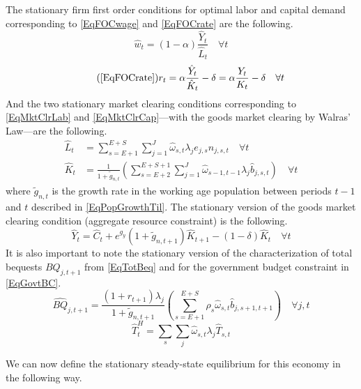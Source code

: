 \documentclass[letterpaper,12pt]{article}
\theoremstyle{definition}
\begin{document}
\begin{spacing}{1.5}
    The stationary firm first order conditions for optimal labor and capital demand corresponding to \eqref{EqFOCwage} and \eqref{EqFOCrate} are the following.
    \begin{equation}\label{EqFOCwageStat}
       \hat{w}_t = (1-\alpha)\frac{\hat{Y}_t}{\hat{L}_t} \quad \forall t
    \end{equation}
    \begin{equation}\tag{\ref{EqFOCrate}}
       r_t = \alpha\frac{\hat{Y}_t}{\hat{K}_t} - \delta = \alpha\frac{Y_t}{K_t} - \delta \quad \forall t
    \end{equation}
    And the two stationary market clearing conditions corresponding to \eqref{EqMktClrLab} and \eqref{EqMktClrCap}---with the goods market clearing by Walras' Law---are the following.
    \begin{align}
      \hat{L}_t &= \sum_{s=E+1}^{E+S}\sum_{j=1}^{J} \hat{\omega}_{s,t}\lambda_j e_{j,s}n_{j,s,t} \quad \forall t \label{EqMktClrLabStat} \\
      \hat{K}_t &= \frac{1}{1 + \tilde{g}_{n,t}}\left(\sum_{s=E+2}^{E+S+1}\sum_{j=1}^{J}\hat{\omega}_{s-1,t-1}\lambda_j \hat{b}_{j,s,t}\right) \quad \forall t \label{EqMktClrCapStat}
    \end{align}
    where $\tilde{g}_{n,t}$ is the growth rate in the working age population between periods $t-1$ and $t$ described in \eqref{EqPopGrowthTil}. The stationary version of the goods market clearing condition (aggregate resource constraint) is the following.
    \begin{equation}\label{EqMktClrGoodsStat}
      \hat{Y}_t = \hat{C}_t + e^{g_y}(1 + \tilde{g}_{n,t+1})\hat{K}_{t+1} - (1-\delta)\hat{K}_t \quad \forall t
    \end{equation}
    It is also important to note the stationary version of the characterization of total bequests $BQ_{j,t+1}$ from \eqref{EqTotBeq} and for the government budget constraint in \eqref{EqGovtBC}.
    \begin{equation}\label{EqTotBeqStat}
      \hat{BQ}_{j,t+1} = \frac{(1+r_{t+1})\lambda_j}{1+\tilde{g}_{n,t+1}}\left(\sum_{s=E+1}^{E+S}\rho_s\hat{\omega}_{s,t}\hat{b}_{j,s+1,t+1}\right) \quad\forall j,t
    \end{equation}
    \begin{equation}\label{EqGovtBCstat}
      \hat{T}^H_t = \sum_s \sum_j \hat{\omega}_{s,t}\lambda_j \hat{T}_{s,t}
    \end{equation}

    We can now define the stationary steady-state equilibrium for this economy in the following way.

    \vspace{7mm}
    \end{spacing}
\end{document}
